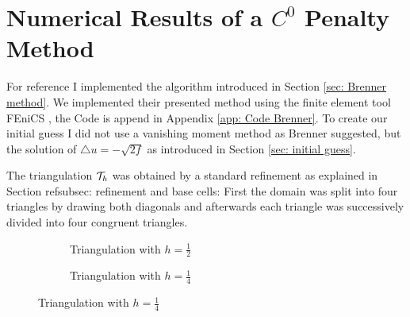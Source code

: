 
\section{Numerical Results of a $C^0$ Penalty Method}\label{sec: numerical results brenner}



For reference I implemented the algorithm introduced in Section \ref{sec: Brenner method}.
We implemented their presented method using the finite element tool FEniCS \cite{FEniCS}, the Code is append in Appendix \ref{app: Code Brenner}. 
To create our initial guess I did not use a vanishing moment method as Brenner suggested, but the solution of $\triangle u = -\sqrt{2f}$ as introduced in Section \ref{sec: initial guess}. 

The triangulation $\mathcal{T}_h$ was obtained by a standard refinement as explained in Section ref{subsec: refinement and base cells}: First the domain was split into four triangles by drawing both diagonals and afterwards each triangle was successively divided into four congruent triangles.
\begin{figure}[H]
	\centering
	\begin{subfigure}{0.45\textwidth}
		\centering
		\edef \n {2}
		
		\caption{Triangulation with $h=\frac 1 2$}
		\label{fig: grid1}
	\end{subfigure}
	\begin{subfigure}{0.45\textwidth}
		\centering
		\edef \n {4}
		
		\caption{Triangulation with $h=\frac 1 4$}
		\label{fig: grid}
	\end{subfigure}	
	\caption{Triangulation with $h=\frac 1 4$}
	\label{fig: grids}
\end{figure}

